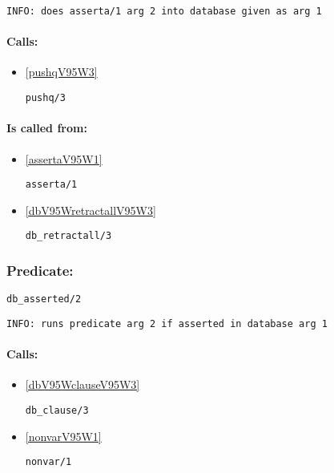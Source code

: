 {\small \begin{verbatim}
INFO: does asserta/1 arg 2 into database given as arg 1

\end{verbatim}}
\paragraph{Calls:} 
\begin{itemize}
\item \ref{pushqV95W3} 
\begin{verbatim}
pushq/3
\end{verbatim}

\end{itemize}
\paragraph{Is called from:} 
\begin{itemize}
\item \ref{assertaV95W1} 
\begin{verbatim}
asserta/1
\end{verbatim}

\item \ref{dbV95WretractallV95W3} 
\begin{verbatim}
db_retractall/3
\end{verbatim}

\end{itemize}

\subsubsection{Predicate:} \label{dbV95WassertedV95W2}

\begin{verbatim}
db_asserted/2
\end{verbatim}

{\small \begin{verbatim}
INFO: runs predicate arg 2 if asserted in database arg 1

\end{verbatim}}
\paragraph{Calls:} 
\begin{itemize}
\item \ref{dbV95WclauseV95W3} 
\begin{verbatim}
db_clause/3
\end{verbatim}

\item \ref{nonvarV95W1} 
\begin{verbatim}
nonvar/1
\end{verbatim}

\end{itemize}

